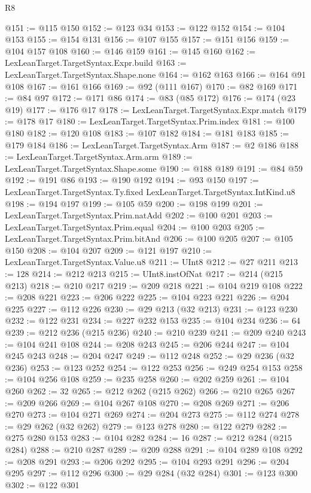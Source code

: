 \begin{lexlean}{R8}
\begin{coremodule}
@151 := @115 @150
@152 := @123 @34
@153 := @122 @152
@154 := @104 @153
@155 := @154 @131
@156 := @107 @155
@157 := @151 @156
@159 := @104 @157 @108
@160 := @146 @159
@161 := @145 @160
@162 := LexLeanTarget.TargetSyntax.Expr.build
@163 := LexLeanTarget.TargetSyntax.Shape.none
@164 := @162 @163
@166 := @164 @91 @108
@167 := @161 @166
@169 := @92 (@111 @167)
@170 := @82 @169
@171 := @84 @97
@172 := @171 @86
@174 := @83 (@85 @172)
@176 := @174 (@23 @19)
@177 := @176 @17
@178 := LexLeanTarget.TargetSyntax.Expr.match
@179 := @178 @17
@180 := LexLeanTarget.TargetSyntax.Prim.index
@181 := @100 @180
@182 := @120 @108
@183 := @107 @182
@184 := @181 @183
@185 := @179 @184
@186 := LexLeanTarget.TargetSyntax.Arm
@187 := @2 @186
@188 := LexLeanTarget.TargetSyntax.Arm.arm
@189 := LexLeanTarget.TargetSyntax.Shape.some
@190 := @188 @189
@191 := @84 @59
@192 := @191 @86
@193 := @190 @192
@194 := @93 @150
@197 := LexLeanTarget.TargetSyntax.Ty.fixed LexLeanTarget.TargetSyntax.IntKind.u8
@198 := @194 @197
@199 := @105 @59
@200 := @198 @199
@201 := LexLeanTarget.TargetSyntax.Prim.natAdd
@202 := @100 @201
@203 := LexLeanTarget.TargetSyntax.Prim.equal
@204 := @100 @203
@205 := LexLeanTarget.TargetSyntax.Prim.bitAnd
@206 := @100 @205
@207 := @105 @150
@208 := @104 @207
@209 := @121 @197
@210 := LexLeanTarget.TargetSyntax.Value.u8
@211 := UInt8
@212 := @27 @211
@213 := 128
@214 := @212 @213
@215 := UInt8.instOfNat
@217 := @214 (@215 @213)
@218 := @210 @217
@219 := @209 @218
@221 := @104 @219 @108
@222 := @208 @221
@223 := @206 @222
@225 := @104 @223 @221
@226 := @204 @225
@227 := @112 @226
@230 := @29 @213 (@32 @213)
@231 := @123 @230
@232 := @122 @231
@234 := @227 @232 @153
@235 := @104 @234
@236 := 64
@239 := @212 @236 (@215 @236)
@240 := @210 @239
@241 := @209 @240
@243 := @104 @241 @108
@244 := @208 @243
@245 := @206 @244
@247 := @104 @245 @243
@248 := @204 @247
@249 := @112 @248
@252 := @29 @236 (@32 @236)
@253 := @123 @252
@254 := @122 @253
@256 := @249 @254 @153
@258 := @104 @256 @108
@259 := @235 @258
@260 := @202 @259
@261 := @104 @260
@262 := 32
@265 := @212 @262 (@215 @262)
@266 := @210 @265
@267 := @209 @266
@269 := @104 @267 @108
@270 := @208 @269
@271 := @206 @270
@273 := @104 @271 @269
@274 := @204 @273
@275 := @112 @274
@278 := @29 @262 (@32 @262)
@279 := @123 @278
@280 := @122 @279
@282 := @275 @280 @153
@283 := @104 @282
@284 := 16
@287 := @212 @284 (@215 @284)
@288 := @210 @287
@289 := @209 @288
@291 := @104 @289 @108
@292 := @208 @291
@293 := @206 @292
@295 := @104 @293 @291
@296 := @204 @295
@297 := @112 @296
@300 := @29 @284 (@32 @284)
@301 := @123 @300
@302 := @122 @301

\end{coremodule}
\end{lexlean}
